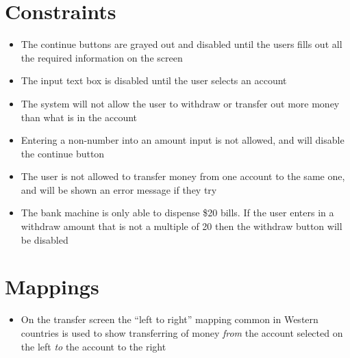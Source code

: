 \documentclass[10pt]{article}
\begin{document}
\section*{Constraints} %
\begin{itemize}
\item The continue buttons are grayed out and disabled until the users fills out all the required information on the screen
\item The input text box is disabled until the user selects an account
\item The system will not allow the user to withdraw or transfer out more money than what is in the account
\item Entering a non-number into an amount input is not allowed, and will disable the continue button
\item The user is not allowed to transfer money from one account to the same one, and will be shown an error message if they try
\item The bank machine is only able to dispense \$20 bills. If the user enters in a withdraw amount that is not a multiple of 20 then the withdraw button will be disabled
\\
\end{itemize}

\section*{Mappings} %
\begin{itemize}
\item On the transfer screen the ``left to right'' mapping common in Western countries is used to show transferring of money \emph{from} the account selected on the left \emph{to} the account to the right\\
\end{itemize}
\end{document}

